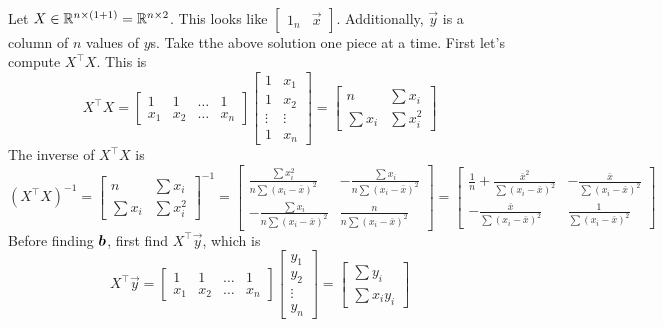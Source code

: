\documentclass[12pt]{article}
\begin{document}
\begin{enumerate}
  \\
Let $X \in \mathbb{R}^{n \times (1+1)} = \mathbb{R}^{n \times 2}$. This looks like $\begin{bmatrix} 1_n & \vec{x} \end{bmatrix}$. Additionally, $\vec{y}$ is a column of $n$ values of $y$s. Take tthe above solution one piece at a time. First let's compute $X^\top X$. This is 
$$ X^\top X = \begin{bmatrix} 1 & 1 & \dots & 1 \\ x_1 & x_2 & \dots & x_n \end{bmatrix} \begin{bmatrix} 1 & x_1 \\ 1 & x_2 \\ \vdots & \vdots \\ 1 & x_n \end{bmatrix} 
= \begin{bmatrix} n & \sum x_i \\ \sum x_i & \sum x_i^2 \end{bmatrix} $$ 
The inverse of $X^\top X$ is $$ (X^\top X)^{-1} = \begin{bmatrix} n & \sum x_i \\ \sum x_i & \sum x_i^2 \end{bmatrix}^{-1} = \begin{bmatrix} \frac{\sum x_i^2}{n\sum (x_i - \bar{x})^2} & -\frac{\sum x_i}{n\sum (x_i - \bar{x})^2} \\ -\frac{\sum x_i}{n\sum (x_i - \bar{x})^2} & \frac{n}{n\sum (x_i - \bar{x})^2} \end{bmatrix} = \begin{bmatrix} \frac{1}{n} + \frac{\bar{x}^2}{\sum (x_i - \bar{x})^2} & -\frac{\bar{x}}{\sum (x_i - \bar{x})^2} \\ -\frac{\bar{x}}{\sum (x_i - \bar{x})^2} & \frac{1}{\sum (x_i - \bar{x})^2} \end{bmatrix} $$ 
Before finding $\boldsymbol{b}$, first find $X^\top \vec{y}$, which is 
$$ X^\top \vec{y} = \begin{bmatrix} 1 & 1 & \dots & 1 \\ x_1 & x_2 & \dots & x_n \end{bmatrix} \begin{bmatrix} y_1 \\ y_2 \\ \vdots \\ y_n \end{bmatrix} = \begin{bmatrix} \sum y_i \\ \sum x_iy_i \end{bmatrix} $$ 

\end{enumerate}
\end{document}
